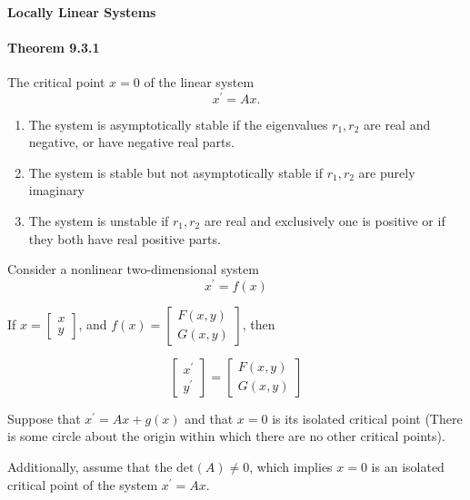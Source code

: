 \documentclass[letterpaper,12pt]{article}
\begin{document}
\paragraph{Locally Linear Systems}

\paragraph{Theorem 9.3.1}The critical point $x = 0$ of the linear system 
\begin{equation}
    x^{\prime} = Ax.
\end{equation}

\begin{enumerate}
    \item The system is asymptotically stable if the eigenvalues $r_1, r_2$ are real and negative, or have
        negative real parts.
    \item The system is stable but not asymptotically stable if $r_1, r_2$ are purely 
        imaginary
    \item The system is unstable if $r_1, r_2$ are real and exclusively one is positive or if 
        they both have real positive parts.
\end{enumerate}

Consider a nonlinear two-dimensional system 
\[
    x^{\prime} = f(x)
\]


If $x = \begin{bmatrix}
    x\\y
\end{bmatrix}$, and $f(x) = \begin{bmatrix}
    F(x,y)\\G(x,y)
\end{bmatrix}$, then 


$$
    \begin{bmatrix}
        x^{\prime}\\ 
        y^{\prime}
    \end{bmatrix} = 
    \begin{bmatrix}
    F(x,y)\\G(x,y)
    \end{bmatrix}
$$


Suppose that $x^{\prime} = Ax + g(x)$ and that $x=0$ is its isolated critical point 
(There is some circle about the origin within which there are no other critical points).


Additionally, assume that the $ \mathrm{det}(A) \ne 0$, which implies $x=0$ is an isolated critical point
of the system $x^{\prime} = Ax$.
\end{document}
